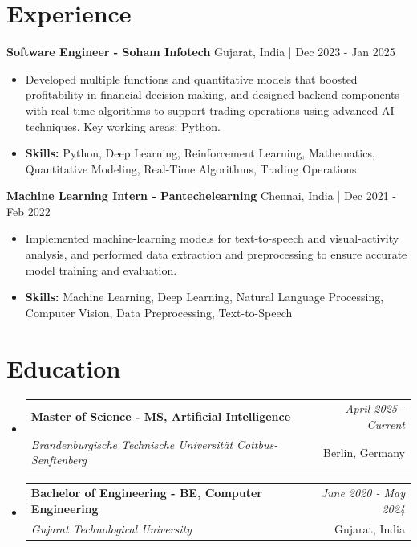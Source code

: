 \documentclass[a4paper,11pt]{article}
\makeatletter
\newcommand{\resumeSubheading}[4]{
\vspace{0.5mm}\item
    \begin{tabular*}{\linewidth}[t]{l@{\extracolsep{\fill}}r}
        \textbf{#1} & \textit{\footnotesize{#4}} \\
        \textit{\footnotesize{#3}} &  \footnotesize{#2}\\
    \end{tabular*}
    \vspace{-2.4mm}
}
\makeatother
\begin{document}
\section{\textbf{Experience}}


\vspace{1mm}
  \textbf{Software Engineer - Soham Infotech} \hfill Gujarat, India | Dec 2023 - Jan 2025
\vspace{-1.5mm} %
\begin{itemize}
  \item Developed multiple functions and quantitative models that boosted profitability in financial decision-making, and designed backend components with real-time algorithms to support trading operations using advanced AI techniques. Key working areas: Python.

\vspace{-2mm}
  \item \textbf{Skills:} Python, Deep Learning, Reinforcement Learning, Mathematics, Quantitative Modeling, Real-Time Algorithms, Trading Operations
\end{itemize}

\vspace{1mm}
  \textbf{Machine Learning Intern - Pantechelearning} \hfill Chennai, India | Dec 2021 - Feb 2022
\vspace{-1.5mm} %
\begin{itemize}
  \item Implemented machine-learning models for text-to-speech and visual-activity analysis, and performed data extraction and preprocessing to ensure accurate model training and evaluation.
\vspace{-2mm}
  \item \textbf{Skills:} Machine Learning, Deep Learning, Natural Language Processing, Computer Vision, Data Preprocessing, Text-to-Speech
\end{itemize}\section{\textbf{Education}}
\vspace{-0.4mm}

\begin{itemize}[leftmargin=0.15in, label={}]
\resumeSubheading
{Master of Science - MS, Artificial Intelligence }{Berlin, Germany}
{Brandenburgische Technische Universität Cottbus-Senftenberg  }{April 2025 - Current}

\vspace{1.0mm} %
\resumeSubheading
{Bachelor of Engineering - BE, Computer Engineering  }{Gujarat, India}
{Gujarat Technological University }{June 2020 - May 2024}

\end{itemize}
\end{document}
